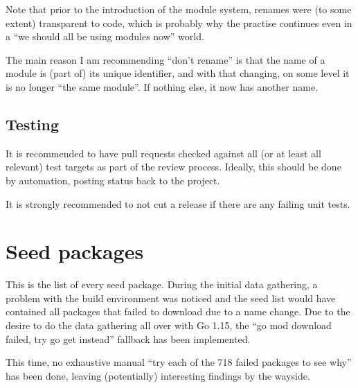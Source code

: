 \documentclass[a4paper]{paper}
\begin{document}
Note that prior to the introduction of the module system, renames were
(to some extent) transparent to code, which is probably why the
practise continues even in a ``we should all be using modules now''
world.

The main reason I am recommending ``don't rename'' is that the name of
a module is (part of) its unique identifier, and with that changing,
on some level it is no longer ``the same module''. If nothing else, it
now has another name.

\subsection{Testing}

It is recommended to have pull requests checked against all (or at
least all relevant) test targets as part of the review
process. Ideally, this should be done by automation, posting status
back to the project.

It is strongly recommended to not cut a release if there are any
failing unit tests.

\section{Seed packages}

This is the list of every seed package. During the initial data gathering, a
problem with the build environment was noticed and the seed list
would have contained all packages that failed to download due to a name
change. Due to the desire to do the data gathering all over with Go 1.15, the ``go mod download failed, try go get instead'' fallback has been implemented.

This time, no exhaustive manual ``try each of the 718 failed packages
to see why'' has been done, leaving (potentially) interesting findings
by the wayside.


\end{document}
